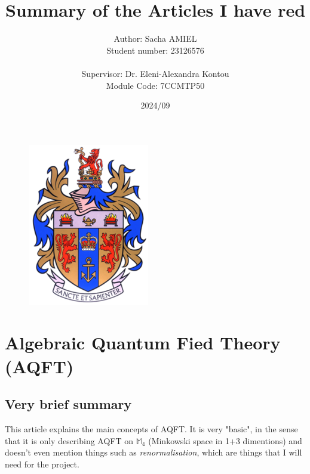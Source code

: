 \documentclass[a4paper,11pt]{article}
\title{Summary of the Articles I have red}
\author{Author: Sacha AMIEL \\
Student number: 23126576\\
\\ Supervisor: Dr. Eleni-Alexandra Kontou \\ Module Code: 7CCMTP50}
\date{2024/09}
\numberwithin{equation}{section}
\theoremstyle{definition}
\begin{document}
\clearpage\maketitle
\thispagestyle{empty}
\begin{figure}[H]
    \centering
    \vspace{100mm}
    \includegraphics[width=0.2\columnwidth]{Template/kcl_logo.png}
\end{figure}

\newpage

\tableofcontents

\newpage
\section{Algebraic Quantum Fied Theory (AQFT)}
\label{Sec:AQFT}
\subsection{Very brief summary}
This article \cite{AQFT_Intro} explains the main concepts of AQFT. It is very "basic", in the sense that it is only describing AQFT on $\mathbb{M}_4$ (Minkowski space in 1+3 dimentions) and doesn't even mention things such as \emph{renormalisation}, which are things that I will need for the project.
\end{document}
